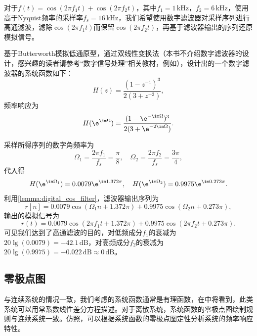 \begin{example}[模拟信号高通滤波的数字化实现]
    对于$f(t)=\cos(2\pi f_1 t)+\cos(2\pi f_2 t)$，其中$f_1=1\,\mathrm{kHz}$，$f_2=6\,\mathrm{kHz}$，使用高于Nyquist频率的采样率$f_s=16\,\mathrm{kHz}$，我们希望使用数字滤波器对采样序列进行高通滤波，滤除$\cos(2\pi f_1 t)$而保留$\cos(2\pi f_2 t)$，再基于滤波器输出的序列还原模拟信号。

    基于Butterworth模拟低通原型，通过双线性变换法（本书不介绍数字滤波器的设计，感兴趣的读者请参考“数字信号处理”相关教材，例如\cite{dsp}），设计出的一个数字滤波器的系统函数如下：
    \begin{equation}
        H(z)=\frac{(1-z^{-1})^3}{2(3+z^{-2})},
    \end{equation}
    频率响应为
    \begin{equation}
        H(\e^{\im\Omega})=\frac{(1-\e^{-\im\Omega})^3}{2(3+\e^{-2\im\Omega})}.
    \end{equation}

    采样所得序列的数字角频率为
    \begin{equation}
        \Omega_1=\frac{2\pi f_1}{f_s}=\frac{\pi}{8},\quad \Omega_2=\frac{2\pi f_2}{f_s}=\frac{3\pi}{4},
    \end{equation}
    代入得
    \begin{equation}
        H(\e^{\im\Omega_1})=0.0079\e^{\im 1.372\pi},\quad H(\e^{\im\Omega_2})=0.9975\e^{\im 0.273\pi}.
    \end{equation}
    利用\cref{lemma:digital_cos_filter}，滤波器输出序列为
    \begin{equation}
        r[n]=0.0079\cos(\Omega_1 n+1.372\pi)+0.9975\cos(\Omega_2 n+0.273\pi),
    \end{equation}
    输出的模拟信号为
    \begin{equation}
        r(t)=0.0079\cos(2\pi f_1 t+1.372\pi)+0.9975\cos(2\pi f_2 t+0.273\pi).
    \end{equation}
    可见我们达到了高通滤波的目的，对低频成分$f_1$的衰减为$20\lg(0.0079)=-42.1\,\mathrm{dB}$，对高频成分$f_2$的衰减为$20\lg(0.9975)=-0.022\,\mathrm{dB}\approx 0\,\mathrm{dB}$。
\end{example}

\subsection{零极点图}\label{sub:zero_pole}

与连续系统的情况一致，我们考虑的系统函数通常是有理函数，在中将看到，此类系统可以用常系数线性差分方程描述。对于离散系统，系统函数的零极点图绘制规则与连续系统一致。仿照，可以根据系统函数的零极点图定性分析系统的频率响应特性。

